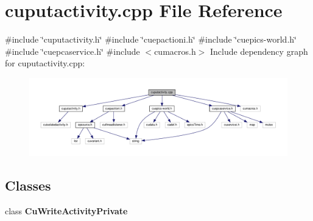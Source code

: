 \section{cuputactivity.\+cpp File Reference}
\label{cuputactivity_8cpp}
{\ttfamily \#include \char`\"{}cuputactivity.\+h\char`\"{}}\newline
{\ttfamily \#include \char`\"{}cuepactioni.\+h\char`\"{}}\newline
{\ttfamily \#include \char`\"{}cuepics-\/world.\+h\char`\"{}}\newline
{\ttfamily \#include \char`\"{}cuepcaservice.\+h\char`\"{}}\newline
{\ttfamily \#include $<$cumacros.\+h$>$}\newline
Include dependency graph for cuputactivity.\+cpp\+:\nopagebreak
\begin{figure}[H]
\begin{center}
\leavevmode
\includegraphics[width=350pt]{cuputactivity_8cpp__incl}
\end{center}
\end{figure}
\subsection*{Classes}
\begin{DoxyCompactItemize}
\item 
class \textbf{ Cu\+Write\+Activity\+Private}
\end{DoxyCompactItemize}
